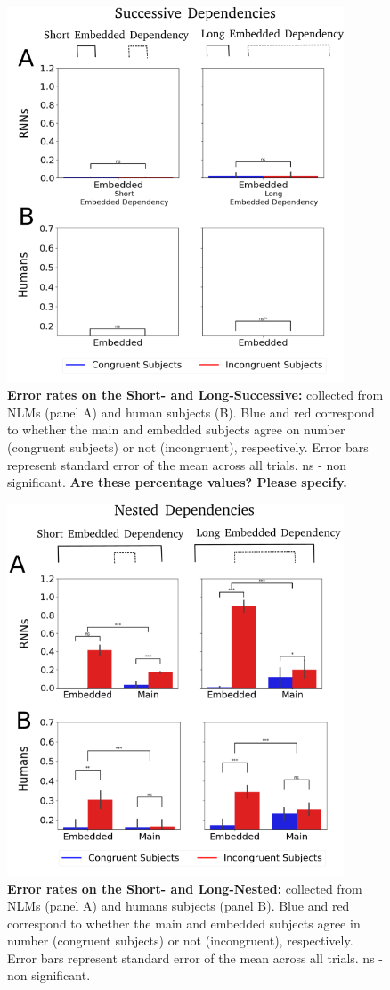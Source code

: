 \begin{figure}[h]
    \centering
    \includegraphics[width=10cm]{figures/error_rates_successive.png}
    \caption{\textbf{Error rates on the Short- and Long-Successive:} collected from NLMs (panel A) and human subjects (B). Blue and red correspond to whether the main and embedded subjects agree on number (congruent subjects) or not (incongruent), respectively. Error bars represent standard error of the mean across all trials. ns - non significant. \textbf{Are these percentage values? Please specify.}}
    \label{fig:SC_results}
\end{figure}


\begin{figure}[h]
    \centering
    \includegraphics[width=10cm]{figures/error_rates_nested.png}
    \caption{\textbf{Error rates on the Short- and Long-Nested:} collected from NLMs (panel A) and humans subjects (panel B). Blue and red correspond to whether the main and embedded subjects agree in number (congruent subjects) or not (incongruent), respectively. Error bars represent standard error of the mean across all trials. ns - non significant.}
    \label{fig:objRC_results}
\end{figure}

